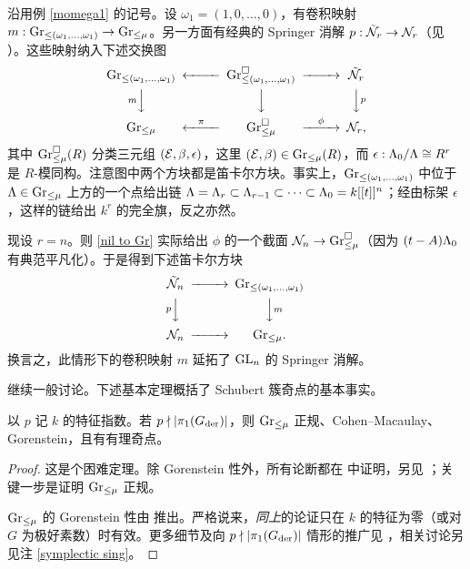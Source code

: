 \begin{ex}\label{conv v.s. springer}
沿用例 \ref{momega1} 的记号。设 $\omega_1=(1,0,\ldots,0)$，有卷积映射 $m:{\operatorname{Gr}}_{\leq(\omega_1,\ldots,\omega_1)}\to{\operatorname{Gr}}_{\leq \mu}$。另一方面有经典的 Springer 消解 $p:\tilde {{\mathcal N}}_r\to{\mathcal N}_r$（见 \cite[\S~1]{Yu}）。这些映射纳入下述交换图
\begin{equation}\label{sat and springer}
\begin{CD}
\Gr_{\leq(\omega_1,\ldots,\omega_1)}@<<< \Gr_{\leq (\omega_1,\ldots,\omega_1)}^{\square}@>>>\tilde \mN_r\\
@VmVV@VVV@VVpV\\
\Gr_{\leq \mu}@<\pi<<\Gr_{\leq \mu}^{\square}@>\phi>> \mN_r,
\end{CD}
\end{equation}
其中 ${\operatorname{Gr}}_{\leq \mu}^{\square}(R)$ 分类三元组 $({\mathcal E},\beta,\epsilon)$，这里 $({\mathcal E},\beta)\in{\operatorname{Gr}}_{\leq \mu}(R)$，而 $\epsilon: {\Lambda}_0/{\Lambda}\cong R^r$ 是 $R$-模同构。注意图中两个方块都是笛卡尔方块。事实上，${\operatorname{Gr}}_{\leq(\omega_1,\ldots,\omega_1)}$ 中位于 ${\Lambda}\in {\operatorname{Gr}}_{\leq \mu}$ 上方的一个点给出链 ${\Lambda}={\Lambda}_r\subset{\Lambda}_{r-1}\subset\cdots\subset {\Lambda}_0=k[[t]]^n$；经由标架 $\epsilon$，这样的链给出 $k^r$ 的完全旗，反之亦然。

现设 $r=n$。则 \eqref{nil to Gr} 实际给出 $\phi$ 的一个截面 ${\mathcal N}_n\to {\operatorname{Gr}}_{\leq \mu}^{\square}$（因为 $(t-A){\Lambda}_0$ 有典范平凡化）。于是得到下述笛卡尔方块
\begin{equation}\label{sat and springer2}
\begin{CD}
\tilde\mN_n@>>>\Gr_{\leq(\omega_1,\ldots,\omega_1)}\\
@VpVV@VVmV\\
\mN_n@>>>\Gr_{\leq \mu}.
\end{CD}
\end{equation}
换言之，此情形下的卷积映射 $m$ 延拓了 ${\operatorname{GL}}_n$ 的 Springer 消解。
\end{ex}

继续一般讨论。下述基本定理概括了 Schubert 簇奇点的基本事实。

\begin{thm}\label{singularity}
以 $p$ 记 $k$ 的特征指数。若 $p\nmid |\pi_1(G_{\operatorname{der}})|$，则 ${\operatorname{Gr}}_{\leq \mu}$ 正规、Cohen--Macaulay、Gorenstein，且有有理奇点。
\end{thm}

\begin{proof}
这是个困难定理。除 Gorenstein 性外，所有论断都在 \cite[Theorem 8]{Fa} 中证明，另见 \cite[Theorem 0.3]{PR}；关键一步是证明 ${\operatorname{Gr}}_{\leq \mu}$ 正规。

${\operatorname{Gr}}_{\leq \mu}$ 的 Gorenstein 性由 \cite[Equation (241)]{BD} 推出。严格说来，\emph{同上}的论证只在 $k$ 的特征为零（或对 $G$ 为极好素数）时有效。更多细节及向 $p\nmid |\pi_1(G_{\operatorname{der}})|$ 情形的推广见 \cite[Theorem 6.11]{Z10}，相关讨论另见注 \ref{symplectic sing}。
\end{proof}

